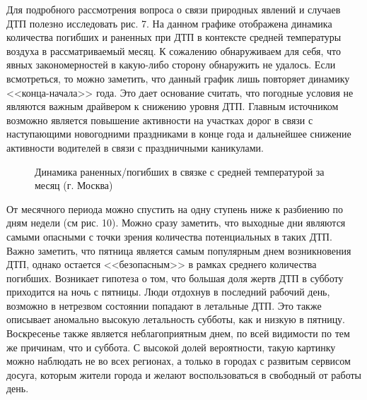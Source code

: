 \documentclass[a4paper, 14pt]{article}
\begin{document}
Для подробного рассмотрения вопроса о связи природных явлений и случаев ДТП полезно исследовать рис. 7. На данном графике отображена динамика количества погибших и раненных при ДТП в контексте средней температуры воздуха в рассматриваемый месяц. К сожалению обнаруживаем для себя, что явных закономерностей в какую-либо сторону обнаружить не удалось. Если всмотреться, то можно заметить, что данный график лишь повторяет динамику <<конца-начала>> года. Это дает основание считать, что погодные условия не являются важным драйвером к снижению уровня ДТП. Главным источником возможно является повышение активности на участках дорог в связи с наступающими новогодними праздниками в конце года и дальнейшее снижение активности водителей в связи с праздничными каникулами. 

\begin{figure}[h]
	\caption{Динамика раненных/погибших в связке с средней температурой за месяц (г. Москва)}
\end{figure}

От месячного периода можно спустить на одну ступень ниже к разбиению по дням недели (см рис. 10). Можно сразу заметить, что выходные дни являются самыми опасными с точки зрения количества потенциальных в таких ДТП. Важно заметить, что пятница является самым популярным днем возникновения ДТП, однако остается <<безопасным>> в рамках среднего количества погибших. Возникает гипотеза о том, что большая доля жертв ДТП в субботу приходится на ночь с пятницы. Люди отдохнув в последний рабочий день, возможно в нетрезвом состоянии попадают в летальные ДТП. Это также описывает аномально высокую летальность субботы, как и низкую в пятницу. Воскресенье также является неблагоприятным днем, по всей видимости по тем же причинам, что и суббота. С высокой долей вероятности, такую картинку можно наблюдать не во всех регионах, а только в городах с развитым сервисом досуга, которым жители города и желают воспользоваться в свободный от работы день.
\end{document}
